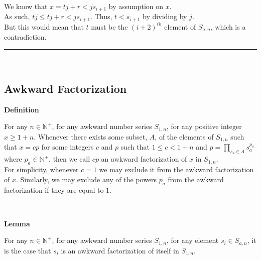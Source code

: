 \documentclass[a4paper,12pt]{article}
\begin{document}
\noindent We know that $x = tj + r < js_{i+1}$ by assumption on $x$.\\

\noindent As such, $tj \leq tj + r < js_{i+1}$. Thus, $t < s_{i + 1}$ by dividing by $j$.\\

\noindent But this would mean that $t$ must be the $(i + 2)^{th}$ element of $S_{a, n}$, which is a contradiction.


\begin{center}
\noindent\rule{8cm}{0.4pt}
\end{center}
\noindent \\













\subsection{Awkward Factorization}
\label{subsection:awkward_factorization}

\label{definition:awkward_factorization}
\hypertarget{definition:awkward_factorization}{}
\begin{tcolorbox}
\textbf{Definition}

For any $n \in \mathbb{N}^+$, for any awkward number series $S_{1,n}$, for any positive integer $x \geq 1 + n$. Whenever there exists some subset, $A$, of the elements of $S_{1,n}$ such that $x = cp$ for some integers $c$ and $p$ such that $1 \leq c < 1 + n$ and $p = \displaystyle \prod_{s_a \in A} s_a^{p_a}$ where $p_a \in \mathbb{N}^+$, then we call $cp$ an awkward factorization of $x$ in $S_{1, n}$.\\

\noindent For simplicity, whenever $c = 1$ we may exclude it from the awkward factorization of $x$. Similarly, we may exclude any of the powers $p_a$ from the awkward factorization if they are equal to $1$.

\end{tcolorbox}
\noindent \\






\label{lemma:awkward_factorization_of_element}
\hypertarget{lemma:awkward_factorization_of_element}{}
\begin{tcolorbox}
\textbf{Lemma}

For any $n \in \mathbb{N}^+$, for any awkward number series $S_{1,n}$, for any element $s_i \in S_{a, n}$, it is the case that $s_i$ is an awkward factorization of itself in $S_{1, n}$.
\end{tcolorbox}
\end{document}

